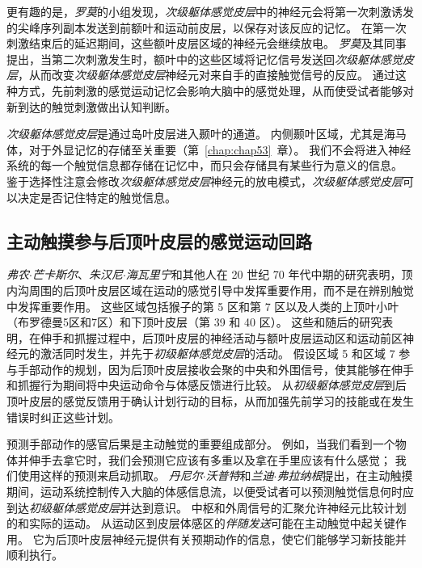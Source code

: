 更有趣的是，\textit{罗莫}的小组发现，\textit{次级躯体感觉皮层}中的神经元会将第一次刺激诱发的尖峰序列副本发送到前额叶和运动前皮层，以保存对该反应的记忆。
在第一次刺激结束后的延迟期间，这些额叶皮层区域的神经元会继续放电。
\textit{罗莫}及其同事提出，当第二次刺激发生时，额叶中的这些区域将记忆信号发送回\textit{次级躯体感觉皮层}，从而改变\textit{次级躯体感觉皮层}神经元对来自手的直接触觉信号的反应。
通过这种方式，先前刺激的感觉运动记忆会影响大脑中的感觉处理，从而使受试者能够对新到达的触觉刺激做出认知判断。


\textit{次级躯体感觉皮层}是通过岛叶皮层进入颞叶的通道。
内侧颞叶区域，尤其是海马体，对于外显记忆的存储至关重要（第~\ref{chap:chap53}~章）。
我们不会将进入神经系统的每一个触觉信息都存储在记忆中，而只会存储具有某些行为意义的信息。
鉴于选择性注意会修改\textit{次级躯体感觉皮层}神经元的放电模式，\textit{次级躯体感觉皮层}可以决定是否记住特定的触觉信息。



\subsection{主动触摸参与后顶叶皮层的感觉运动回路}

\textit{弗农$\cdot$芒卡斯尔}、\textit{朱汉尼$\cdot$海瓦里宁}和其他人在 20 世纪 70 年代中期的研究表明，顶内沟周围的后顶叶皮层区域在运动的感觉引导中发挥重要作用，而不是在辨别触觉中发挥重要作用。
这些区域包括猴子的第 5 区和第 7 区以及人类的上顶叶小叶（布罗德曼5区和7区）和下顶叶皮层（第 39 和 40 区）。
这些和随后的研究表明，在伸手和抓握过程中，后顶叶皮层的神经活动与额叶皮层运动区和运动前区神经元的激活同时发生，并先于\textit{初级躯体感觉皮层}的活动。
假设区域 5 和区域 7 参与手部动作的规划，因为后顶叶皮层接收会聚的中央和外围信号，使其能够在伸手和抓握行为期间将中央运动命令与体感反馈进行比较。
从\textit{初级躯体感觉皮层}到后顶叶皮层的感觉反馈用于确认计划行动的目标，从而加强先前学习的技能或在发生错误时纠正这些计划。


预测手部动作的感官后果是主动触觉的重要组成部分。
例如，当我们看到一个物体并伸手去拿它时，我们会预测它应该有多重以及拿在手里应该有什么感觉；
我们使用这样的预测来启动抓取。
\textit{丹尼尔$\cdot$沃普特}和\textit{兰迪$\cdot$弗拉纳根}提出，在主动触摸期间，运动系统控制传入大脑的体感信息流，以便受试者可以预测触觉信息何时应到达\textit{初级躯体感觉皮层}并达到意识。 
中枢和外周信号的汇聚允许神经元比较计划的和实际的运动。
从运动区到皮层体感区的\textit{伴随发送}可能在主动触觉中起关键作用。
它为后顶叶皮层神经元提供有关预期动作的信息，使它们能够学习新技能并顺利执行。



